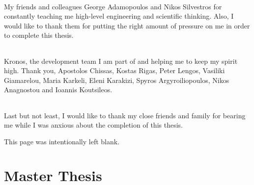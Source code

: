 \documentclass[12pt,a4paper]{book}
\begin{document}
\paragraph{} My friends and colleagues George Adamopoulos and Nikos Silvestros for constantly teaching me high-level engineering and scientific thinking. Also, I would like to thank them for putting the right amount of pressure on me in order to complete this thesis.

\paragraph{} Kronos, the development team I am part of and helping me to keep my spirit high. Thank you, Apostolos Chissas, Kostas Rigas, Peter Lengos, Vasiliki Giamarelou, Maria Karkeli, Eleni Karakizi, Spyros Argyroiliopoulos, Nikos Anagnostou and Ioannis Koutsileos. 

\paragraph{} Last but not least, I would like to thank my close friends and family for bearing me while I was anxious about the completion of this thesis.

\newpage
\begin{center}
This page was intentionally left blank.
\end{center}

\newpage
{}
\part{Master Thesis}





\newpage



\end{document}
